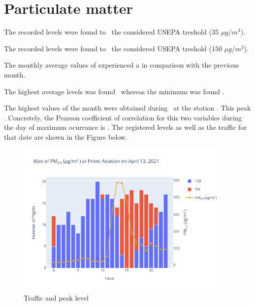 \documentclass[12pt, oneside]{book}
\begin{document}
\section{Particulate matter}

The recorded  levels were found to \tresholdPMtwofive\ the considered USEPA treshold (35 $\mu g/m^3$).

The recorded  levels were found to \tresholdPMten\ the considered USEPA treshold (150 $\mu g/m^3$).



The monthly average values of  experienced a \monthChangePMtwofive in comparison with the previous month.

The highest average  levels was found \maxDailyPMtwofive\ whereas the minimum was found \minDailyPMtwofive .

The highest  values of the month were obtained during  \dayMaxPMtwofive \ at the station \stationMaxPMtwofive . This peak \relTrafficMaxPMtwofive . Concretely, the Pearson coefficient of correlation for this two variables during the day of maximum ocurrance is \correlPMtwofive .  The registered levels as well as the traffic for that date are shown in the Figure below.

{\begin{figure}[H]
\centering
\includegraphics[width=0.95\textwidth, keepaspectratio]{image14}
\caption{Traffic and  peak level}\label{image14}
\end{figure}}{}
\end{document}
